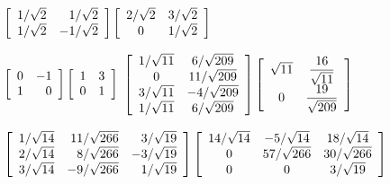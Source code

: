 \begin{enumerate}[!HW!, start=1]
\begin{multicols}{2}
\itemspade $\mtx{rr}{1/\sqrt{2} & 1/\sqrt{2}  \\ 1/\sqrt{2} & -1/\sqrt{2} }\mtx{cc}{2/\sqrt{2} & 3/\sqrt{2} \\ 0 & 1/\sqrt{2} }$%
\end{multicols}
\begin{multicols}{2}
\itemspade $\mtx{rr}{0 & -1  \\ 1 &0 }\mtx{cc}{1 & 3 \\ 0 & 1 }$ %
\itemspade %
$\mtx{cc}{1/\sqrt{11} & 6/\sqrt{209} \\ 0 & 11/\sqrt{209} \\ 3/\sqrt{11} & -4/\sqrt{209} \\ 1/\sqrt{11} & 6/\sqrt{209}}\mtx{cc}{\sqrt{11} & \dfrac{16}{\sqrt{11}}\\ 0 & \dfrac{19}{\sqrt{209}}}$ %
\end{multicols}
\itemspade $\mtx{rrr}{1/\sqrt{14} & 11/\sqrt{266} & 3/\sqrt{19} \\ 2/\sqrt{14} & 8/\sqrt{266} & -3/\sqrt{19} \\ 3/\sqrt{14} & -9/\sqrt{266} & 1/\sqrt{19} }\mtx{ccc}{14/\sqrt{14} & -5/\sqrt{14} & 18/\sqrt{14} \\ 0 & 57/\sqrt{266} & 30/\sqrt{266} \\ 0 & 0 & 3/\sqrt{19} }$ %
\end{enumerate}
